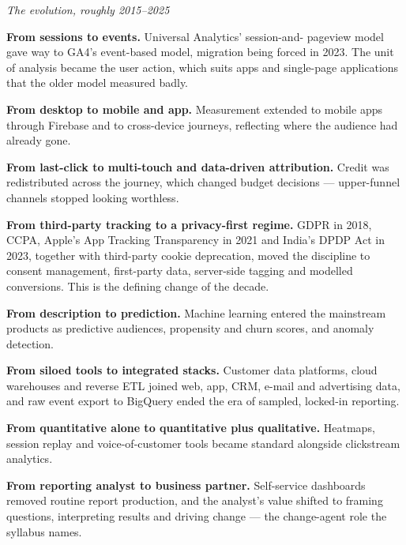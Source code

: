 \begin{qlist}
\textit{The evolution, roughly 2015--2025}
\begin{apts}
\item \textbf{From sessions to events.} Universal Analytics' session-and-
      pageview model gave way to GA4's event-based model, migration being
      forced in 2023. The unit of analysis became the user action, which suits
      apps and single-page applications that the older model measured badly.
\item \textbf{From desktop to mobile and app.} Measurement extended to mobile
      apps through Firebase and to cross-device journeys, reflecting where the
      audience had already gone.
\item \textbf{From last-click to multi-touch and data-driven attribution.}
      Credit was redistributed across the journey, which changed budget
      decisions --- upper-funnel channels stopped looking worthless.
\item \textbf{From third-party tracking to a privacy-first regime.} GDPR in
      2018, CCPA, Apple's App Tracking Transparency in 2021 and India's DPDP
      Act in 2023, together with third-party cookie deprecation, moved the
      discipline to consent management, first-party data, server-side tagging
      and modelled conversions. This is the defining change of the decade.
\item \textbf{From description to prediction.} Machine learning entered the
      mainstream products as predictive audiences, propensity and churn scores,
      and anomaly detection.
\item \textbf{From siloed tools to integrated stacks.} Customer data platforms,
      cloud warehouses and reverse ETL joined web, app, CRM, e-mail and
      advertising data, and raw event export to BigQuery ended the era of
      sampled, locked-in reporting.
\item \textbf{From quantitative alone to quantitative plus qualitative.}
      Heatmaps, session replay and voice-of-customer tools became standard
      alongside clickstream analytics.
\item \textbf{From reporting analyst to business partner.} Self-service
      dashboards removed routine report production, and the analyst's value
      shifted to framing questions, interpreting results and driving change ---
      the change-agent role the syllabus names.
\end{apts}


\end{qlist}
